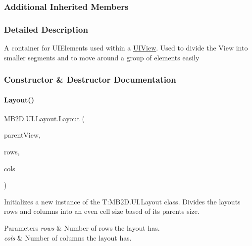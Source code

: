 \subsubsection*{Additional Inherited Members}


\subsubsection{Detailed Description}
A container for U\+I\+Elements used within a \hyperlink{class_m_b2_d_1_1_u_i_1_1_u_i_view}{U\+I\+View}. Used to divide the View into smaller segments and to move around a group of elements easily 



\subsubsection{Constructor \& Destructor Documentation}
\hypertarget{class_m_b2_d_1_1_u_i_1_1_layout_a86bd9b8fde99644021327ce66b71d0b5}{}\label{class_m_b2_d_1_1_u_i_1_1_layout_a86bd9b8fde99644021327ce66b71d0b5} 
\paragraph{\texorpdfstring{Layout()}{Layout()}}
{\footnotesize\ttfamily M\+B2\+D.\+U\+I.\+Layout.\+Layout (\begin{DoxyParamCaption}\item[{\hyperlink{class_m_b2_d_1_1_u_i_1_1_u_i_view}{U\+I\+View}}]{parent\+View,  }\item[{int}]{rows,  }\item[{int}]{cols }\end{DoxyParamCaption})\hspace{0.3cm}{\ttfamily [inline]}}



Initializes a new instance of the T\+:\+M\+B2\+D.\+U\+I.\+Layout class. Divides the layouts rows and columns into an even cell size based of its parents size. 


\begin{DoxyParams}{Parameters}
{\em rows} & Number of rows the layout has.\\
\hline
{\em cols} & Number of columns the layout has.\\
\hline
\end{DoxyParams}


